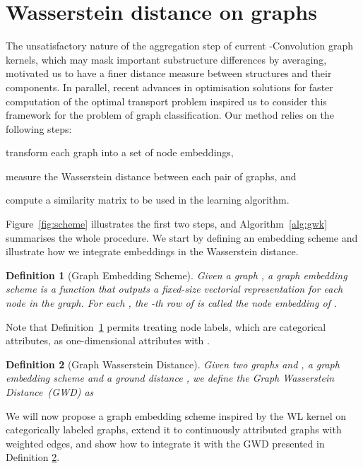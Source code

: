 \documentclass{article}
\newtheorem{definition}{Definition}
\begin{document}
\section{Wasserstein distance on graphs}
\label{sec:GWD}

The unsatisfactory nature of the aggregation step of current \mbox{-Convolution} graph kernels, which may mask important substructure differences by averaging, motivated us to have a finer distance measure between structures and their components. 
In parallel, recent advances in optimisation solutions for faster computation of the optimal transport problem inspired us to consider this framework for the problem of graph classification.
Our method relies on the following steps:
\begin{inparaenum}[(1)]
 \item transform each graph into a set of node embeddings,
 \item measure the Wasserstein distance between each pair of graphs, and
 \item compute a similarity matrix to be used in the learning algorithm.
\end{inparaenum}
Figure~\ref{fig:scheme} illustrates the first two steps, and 
Algorithm~\ref{alg:gwk} summarises the whole procedure. We start by defining an embedding scheme and illustrate how we integrate embeddings in the Wasserstein distance.

\begin{definition}[Graph Embedding Scheme]
\label{def:embed_scheme}
Given a graph , a graph embedding scheme  is a function that outputs a fixed-size vectorial representation for each node in the graph. For each , the -th row of  is called the node embedding of .
\end{definition}

Note that Definition~\ref{def:embed_scheme} permits treating node labels, which are categorical attributes, as one-dimensional attributes with .

\begin{definition}[Graph Wasserstein Distance]
\label{def:graph_wass}
Given two graphs  and , a graph embedding scheme  and a ground distance , we define the Graph Wasserstein Distance~(GWD) as

\end{definition}


We will now propose a graph embedding scheme inspired by the WL kernel on categorically labeled graphs, extend it to continuously attributed graphs with weighted edges, and show how to integrate it with the GWD presented in Definition \ref{def:graph_wass}. 
\end{document}
